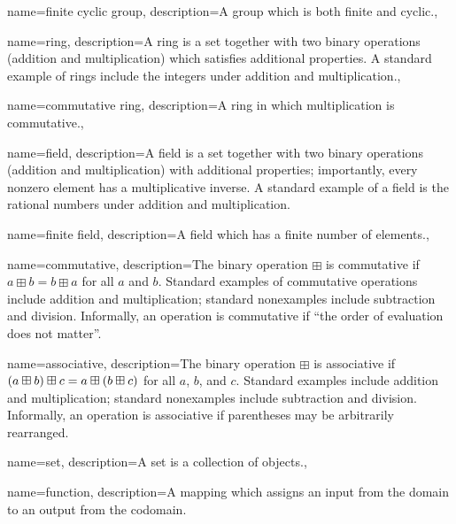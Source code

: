 {
    name={finite cyclic group},
    description={A \gls{group} which is both finite and cyclic.},
}

{
    name={ring},
    description={A ring is a \gls{set} together with two binary operations
        (addition and multiplication) which satisfies additional properties.
        A standard example of rings include the integers under addition
        and multiplication.},
}

{
    name={commutative ring},
    description={A \gls{ring} in which multiplication is \gls{commutative}.},
}

{
    name={field},
    description={A field is a \gls{set} together with two binary operations
        (addition and multiplication) with additional properties;
        importantly, every nonzero element has a multiplicative inverse.
        A standard example of a field is the rational numbers
        under addition and multiplication.}
}

{
    name={finite field},
    description={A \gls{field} which has a finite number of elements.},
}

{
    name={commutative},
    description={The binary operation $\boxplus$ is commutative if
        $a\boxplus b = b\boxplus a$ for all $a$ and $b$.
        Standard examples of commutative operations include addition
        and multiplication;
        standard nonexamples include subtraction and division.
        Informally, an operation is commutative if
        ``the order of evaluation does not matter''.}
}

{
    name={associative},
    description={The binary operation $\boxplus$ is associative if
        $\left( a\boxplus b \right)\boxplus c = a\boxplus \left( b\boxplus c \right)$
        for all $a$, $b$, and $c$.
        Standard examples include addition and multiplication;
        standard nonexamples include subtraction and division.
        Informally, an operation is associative if parentheses may be
        arbitrarily rearranged.}
}

{
    name={set},
    description={A set is a collection of objects.},
}

{
    name={function},
    description={A mapping which assigns an input from the domain
        to an output from the codomain.}
}

